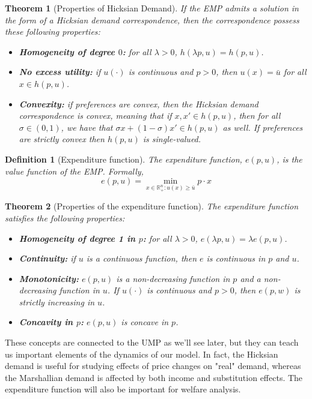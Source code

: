 \documentclass[12pt]{report}
\newtheorem{theorem}{Theorem}[chapter]
\newtheorem{definition}{Definition}[chapter]
\begin{document}
\begin{theorem}[Properties of Hicksian Demand]
If the EMP admits a solution in the form of a Hicksian demand correspondence, then the correspondence possess these following properties:\begin{itemize}
\item \textbf{Homogeneity of degree $0$:} for all $\lambda >0$, $h(\lambda p, u) = h(p,u)$.
\item \textbf{No excess utility:} if $u(\cdot)$ is continuous and $p>0$, then $u(x) = \bar u$ for all $x\in h(p,u)$.
\item \textbf{Convexity:} if preferences are convex, then the Hicksian demand correspondence is convex, meaning that if $x, x'\in h(p,u)$, then for all $\sigma\in(0,1)$, we have that $\sigma x + (1-\sigma) x'\in h(p,u)$ as well. If preferences are strictly convex then $h(p,u)$ is single-valued.
\end{itemize}
\end{theorem}

\begin{definition}[Expenditure function]
The expenditure function, $e(p,u)$, is the value function of the EMP. Formally, $$e(p,u) = \min_{x\in\mathbb{R}_{+}^n:u(x)\geq\bar u} p\cdot x$$
\end{definition}

\begin{theorem}[Properties of the expenditure function]
The expenditure function satisfies the following properties:\begin{itemize}
\item \textbf{Homogeneity of degree 1 in $p$:} for all $\lambda > 0$, $e(\lambda p, u) = \lambda e(p,u)$.
\item \textbf{Continuity:} if $u$ is a continuous function, then $e$ is continuous in $p$ and $u$.
\item \textbf{Monotonicity:} $e(p,u)$ is a non-decreasing function in $p$ and a non-decreasing function in $u$. If $u(\cdot)$ is continuous and $p>0$, then $e(p,w)$ is strictly increasing in $u$.
\item \textbf{Concavity in $p$:} $e(p,u)$ is concave in $p$.
\end{itemize}
\end{theorem}

These concepts are connected to the UMP as we'll see later, but they can teach us important elements of the dynamics of our model. In fact, the Hicksian demand is useful for studying effects of price changes on "real" demand, whereas the Marshallian demand is affected by both income and substitution effects. The expenditure function will also be important for welfare analysis.
\end{document}
